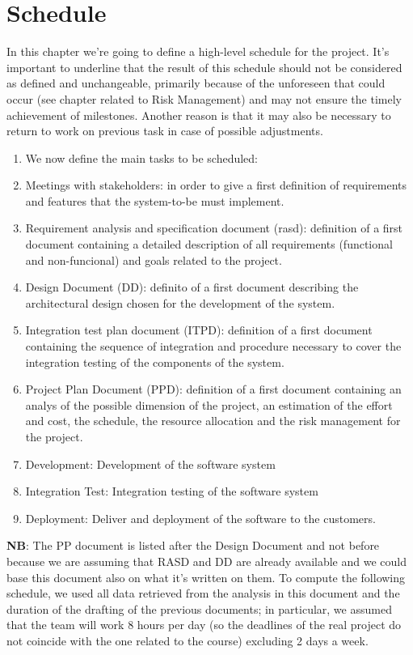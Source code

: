 \documentclass[10pt, a4paper,titlepage]{article}
\begin{document}
\section{Schedule}
In this chapter we’re going to define a high-level schedule for the project.
It’s important to underline that the result of this schedule should not be considered as defined and unchangeable, primarily because of the unforeseen that could occur (see chapter related to Risk Management) and may not ensure the timely achievement of milestones. Another reason is that it may also be necessary to return to work on previous task in case of possible adjustments.
\begin{enumerate}
\item We now define the main tasks to be scheduled:
\item Meetings with stakeholders: in order to give a first definition of requirements and features that the system-to-be must implement.
\item Requirement analysis and specification document (rasd): definition of a first document containing a detailed description of all requirements (functional and non-funcional) and goals related to the project.
\item Design Document (DD): definito of a first document describing the architectural design chosen for the development of the system.
\item Integration test plan document (ITPD): definition of a first document containing the sequence of integration and procedure necessary to cover the integration testing of the components of the system.
\item Project Plan Document (PPD): definition of a first document containing an analys of the possible dimension of the project, an estimation of the effort and cost, the schedule, the resource allocation and the risk management for the project.
\item Development: Development of the software system
\item Integration Test: Integration testing of the software system
\item Deployment: Deliver and deployment of the software to the customers.
\end{enumerate}
\textbf{NB}: The PP document is listed after the Design Document and not before because we are assuming that RASD and DD are already available and we could base this document also on what it’s written on them.
To compute the following schedule, we used all data retrieved from the analysis in this document and the duration of the drafting of the previous documents; in particular, we assumed that the team will work 8 hours per day (so the deadlines of the real project do not coincide with the one related to the course) excluding 2 days a week.
\end{document}
